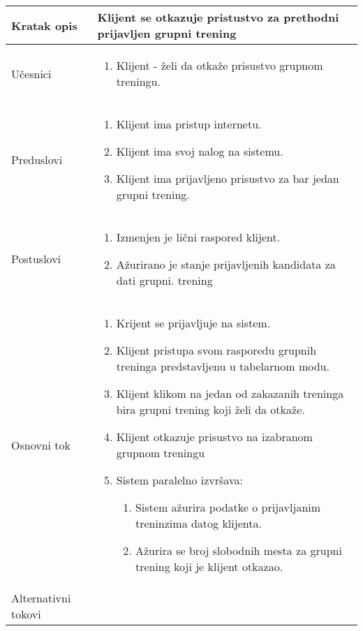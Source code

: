 \documentclass[../grupniTreninzi.tex]{subfiles}
\begin{document}
\begin{longtable}{| p{} | p{} |} 
\hline
    Kratak opis &  Klijent se otkazuje pristustvo za prethodni prijavljen grupni trening\\ 
\hline    
    Učesnici &
    \begin{enumerate}
        \item Klijent - želi da otkaže prisustvo grupnom treningu.
    \end{enumerate}\\
\hline
   Preduslovi & 
   \begin{enumerate}
        \item Klijent ima pristup internetu.
        \item Klijent ima svoj nalog na sistemu.
        \item Klijent ima prijavljeno prisustvo za bar jedan grupni trening.
    \end{enumerate}\\
\hline  
    Postuslovi &
    \begin{enumerate}
        \item Izmenjen je lični raspored klijent.
        \item Ažurirano je stanje prijavljenih kandidata za dati grupni. trening
    \end{enumerate}\\
\hline
    Osnovni tok & 
    \begin{enumerate}
        \item Krijent se prijavljuje na sistem.
        \item Klijent pristupa svom rasporedu grupnih treninga predstavljenu u tabelarnom modu.
        \item Klijent klikom na jedan od zakazanih treninga bira grupni trening koji želi da otkaže.
        \item Klijent otkazuje prisustvo na izabranom grupnom treningu
        \item Sistem paralelno izvršava:
            \begin{enumerate}
                \item Sistem ažurira podatke o prijavljanim treninzima datog klijenta.
                \item Ažurira se broj slobodnih mesta za grupni trening koji je klijent otkazao.
            \end{enumerate}
    \end{enumerate}\\
\hline
    Alternativni tokovi & 
       \begin{enumerate}

\end{enumerate}
\end{longtable}
\end{document}
